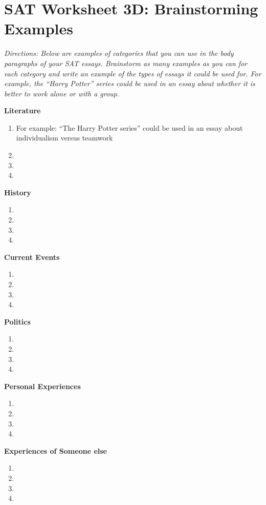 \newpage
\section[Brainstorming Ideas]{SAT Worksheet 3D: Brainstorming Examples}
\bigskip
\textit{Directions: Below are examples of categories that you can use in the body paragraphs of your SAT essays. Brainstorm as many examples as you can for each category and write an example of the types of essays it could be used for. For example, the “Harry Potter” series could be used in an essay about whether it is better to work alone or with a group.}

\begin{spacing}{2}
\textbf{Literature}
\begin{enumerate}
\item For example: ``The Harry Potter series'' could be used in an essay about individualism versus teamwork
\item
\item
\item
\end{enumerate}

\vfill
\textbf{History}
\begin{enumerate}
\item
\item
\item
\item
\end{enumerate}

\vfill
\textbf{Current Events}
\begin{enumerate}
\item
\item
\item
\item
\end{enumerate}
\end{spacing}

\newpage
\begin{spacing}{2}
\textbf{Politics}

\begin{enumerate}
\item
\item
\item
\item
\end{enumerate}

\vfill
\textbf{Personal Experiences}

\begin{enumerate}
\item
\item
\item
\item
\end{enumerate}

\vfill
\textbf{Experiences of Someone else}

\begin{enumerate}
\item
\item
\item
\item
\end{enumerate}
\end{spacing}
\vfill\vfill
\newpage

